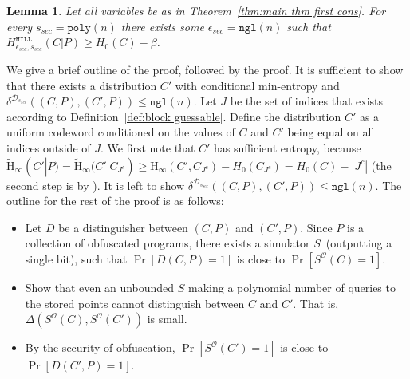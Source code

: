 \documentclass[11pt]{article}
\newcommand{\thref}[1]{\mbox{Theorem~\ref{#1}}}
\newcommand{\defref}[1]{\mbox{Definition~\ref{#1}}}
\newcommand{\hill}{\ensuremath{\mathtt{HILL}}\xspace}
\newcommand{\poly}{\ensuremath{\mathtt{poly}}\xspace}
\newcommand{\ngl}{\ensuremath{\mathtt{ngl}}\xspace}
\newcommand{\Hoo}{\mathrm{H}_\infty}
\newcommand{\Hav}{\tilde{\mathrm{H}}_\infty}
\newtheorem{lemma}[theorem]{Lemma}
\begin{document}
\begin{lemma}
\label{lem:security of cons}
Let all variables be as in \thref{thm:main thm first cons}.  For every $s_{sec} = \poly(n)$ there exists some $\epsilon_{sec} = \ngl(n)$ such that $H^{\hill}_{\epsilon_{sec}, s_{sec}}( C | P ) \geq H_0(C) - \beta$.
\end{lemma}

We give a brief outline of the proof, followed by the proof.
It is sufficient to show that there exists a distribution $C'$ with conditional min-entropy and $\delta^{\mathcal{D}_{s_{sec}}}((C, P), (C', P))\le \ngl(n)$.  Let $J$ be the set of indices that exists according to \defref{def:block guessable}. Define the distribution $C'$ as a uniform codeword conditioned on the values of $C$ and $C'$ being equal on all indices outside of $J$.  We first note that $C'$ has sufficient entropy, because $\Hav(C' |P) = \Hav(C' | C_{J^c}) \ge \Hoo(C', C_{J^c}) - H_0(C_{J^c})  = H_0(C) - |J^c|$ (the second step is by \cite[Lemma 2.2b]{DBLP:journals/siamcomp/DodisORS08}).  It is left to show $\delta^{\mathcal{D}_{s_{sec}}}((C, P), (C', P)) \le \ngl(n)$.
The outline for the rest of the proof is as follows:
\begin{itemize}
\item Let $D$ be a distinguisher between $(C, P)$ and $(C', P)$. Since $P$ is a collection of obfuscated programs, there exists a simulator $S$~(outputting a single bit), such that $\Pr[D(C, P)=1]$ is close to $\Pr[S^{\mathcal{O}}(C)=1]$.
\item Show that even an unbounded $S$ making a polynomial number of queries to the stored points cannot distinguish between $C$ and $C'$.  That is, $\Delta(S^{\mathcal{O}}(C),S^{\mathcal{O}}(C'))$ is small.
\item By the security of obfuscation, $\Pr[S^{\mathcal{O}}(C')=1]$ is close to $\Pr[D(C', P)=1]$.
\end{itemize}
\end{document}

